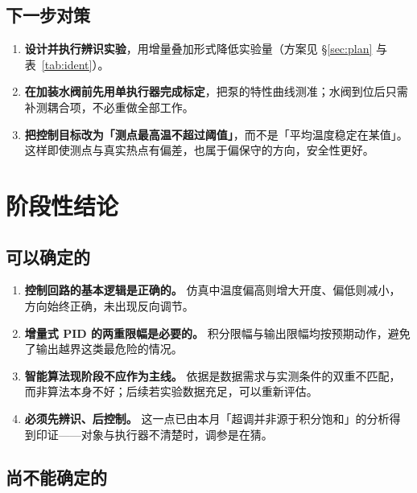 \documentclass[stage2]{ydzjreport}
\begin{document}
\subsection{下一步对策}

\begin{enumerate}
  \item \textbf{设计并执行辨识实验}，用增量叠加形式降低实验量（方案见 §\ref{sec:plan} 与 表~\ref{tab:ident}）。
  \item \textbf{在加装水阀前先用单执行器完成标定}，把泵的特性曲线测准；水阀到位后只需补测耦合项，不必重做全部工作。
  \item \textbf{把控制目标改为「测点最高温不超过阈值」}，而不是「平均温度稳定在某值」。这样即使测点与真实热点有偏差，也属于偏保守的方向，安全性更好。
\end{enumerate}

\section{阶段性结论}

\subsection{可以确定的}

\begin{enumerate}
  \item \textbf{控制回路的基本逻辑是正确的。} 仿真中温度偏高则增大开度、偏低则减小，方向始终正确，未出现反向调节。
  \item \textbf{增量式 PID 的两重限幅是必要的。} 积分限幅与输出限幅均按预期动作，避免了输出越界这类最危险的情况。
  \item \textbf{智能算法现阶段不应作为主线。} 依据是数据需求与实测条件的双重不匹配，而非算法本身不好；后续若实验数据充足，可以重新评估。
  \item \textbf{必须先辨识、后控制。} 这一点已由本月「超调并非源于积分饱和」的分析得到印证——对象与执行器不清楚时，调参是在猜。
\end{enumerate}

\subsection{尚不能确定的}
\label{sec:que}
\end{document}

